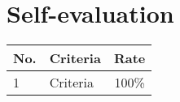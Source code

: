 \section{Self-evaluation}
\begin{center}
  \renewcommand{\arraystretch}{1.5}
  \begin{tabular}{|l|p{}|c|}
    \hline
    \textbf{No.} & \textbf{Criteria} & \textbf{Rate} \\ \hline
    1            & Criteria          & 100\%         \\ \hline
  \end{tabular}
\end{center}
